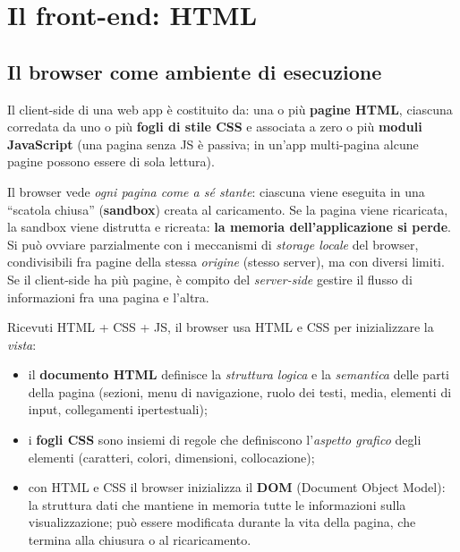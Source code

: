 \chapter{Il front-end: HTML}

\section{Il browser come ambiente di esecuzione}

Il client-side di una web app \`e costituito da: una o pi\`u \textbf{pagine HTML}, ciascuna
corredata da uno o pi\`u \textbf{fogli di stile CSS} e associata a zero o pi\`u
\textbf{moduli JavaScript} (una pagina senza JS \`e passiva; in un'app multi-pagina alcune
pagine possono essere di sola lettura).

\begin{importante}[Sandbox]
Il browser vede \emph{ogni pagina come a s\'e stante}: ciascuna viene eseguita in una
``scatola chiusa'' (\textbf{sandbox}) creata al caricamento. Se la pagina viene ricaricata,
la sandbox viene distrutta e ricreata: \textbf{la memoria dell'applicazione si perde}.
Si pu\`o ovviare parzialmente con i meccanismi di \emph{storage locale} del browser,
condivisibili fra pagine della stessa \emph{origine} (stesso server), ma con diversi limiti.
Se il client-side ha pi\`u pagine, \`e compito del \emph{server-side} gestire il flusso di
informazioni fra una pagina e l'altra.
\end{importante}

Ricevuti HTML + CSS + JS, il browser usa HTML e CSS per inizializzare la \emph{vista}:
\begin{itemize}
  \item il \textbf{documento HTML} definisce la \emph{struttura logica} e la \emph{semantica}
        delle parti della pagina (sezioni, menu di navigazione, ruolo dei testi, media,
        elementi di input, collegamenti ipertestuali);
  \item i \textbf{fogli CSS} sono insiemi di regole che definiscono l'\emph{aspetto grafico}
        degli elementi (caratteri, colori, dimensioni, collocazione);
  \item con HTML e CSS il browser inizializza il \textbf{DOM} (Document Object Model): la
        struttura dati che mantiene in memoria tutte le informazioni sulla visualizzazione;
        pu\`o essere modificata durante la vita della pagina, che termina alla chiusura o al
        ricaricamento.
\end{itemize}

